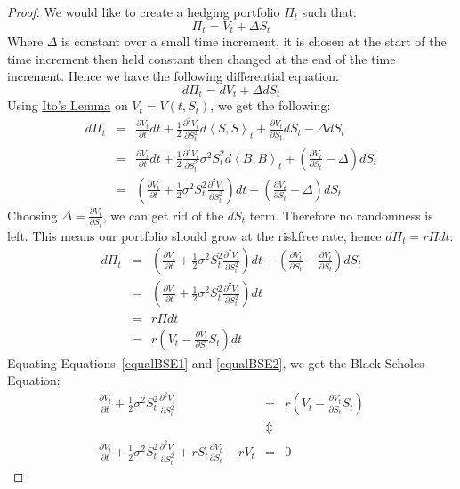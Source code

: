 \documentclass[11pt]{article}
\theoremstyle{definition}
\newcommand{\brac}[1]{\left(#1\right)}
\newcommand{\pbrac}[1]{\left\langle#1\right\rangle}
\newcommand{\pardiff}[2]{\frac{\partial #1}{\partial #2}}
\begin{document}
	\begin{proof}
		We would like to create a hedging portfolio $\Pi_t$ such that:
		$$\Pi_t = V_t + \Delta S_t$$
		Where $\Delta$ is constant over a small time increment, it is chosen at the start of the time increment then held constant then changed at the end of the time increment. Hence we have the following differential equation:
		$$d\Pi_t = dV_t + \Delta dS_t$$
		Using \hyperref[itosLemma]{Ito's Lemma} on $V_t = V\brac{t,S_t}$, we get the following:
		\begin{eqnarray*}
			d\Pi_t &=& \pardiff{V_t}{t}dt + \frac{1}{2}\pardiff{^2V_t}{S_t^2}d\pbrac{S,S}_t + \pardiff{V_t}{S_t}dS_t - \Delta dS_t\\
			&=& \pardiff{V_t}{t}dt + \frac{1}{2}\pardiff{^2V_t}{S_t^2}\sigma^2S_t^2d\pbrac{B,B}_t + \brac{\pardiff{V_t}{S_t} - \Delta} dS_t\\
			&=& \brac{\pardiff{V_t}{t} + \frac{1}{2}\sigma^2S_t^2\pardiff{^2V_t}{S_t^2}}dt+ \brac{\pardiff{V_t}{S_t} - \Delta} dS_t
		\end{eqnarray*}
		Choosing $\Delta = \pardiff{V_t}{S_t}$, we can get rid of the $dS_t$ term. Therefore no randomness is left. This means our portfolio should grow at the riskfree rate, hence $d\Pi_t = r\Pi dt$:
		\begin{eqnarray}
			d\Pi_t &=& \brac{\pardiff{V_t}{t} + \frac{1}{2}\sigma^2S_t^2\pardiff{^2V_t}{S_t^2}}dt+ \brac{\pardiff{V_t}{S_t} - \pardiff{V_t}{S_t}} dS_t\\
			&=& \brac{\pardiff{V_t}{t} + \frac{1}{2}\sigma^2S_t^2\pardiff{^2V_t}{S_t^2}}dt\label{equalBSE1}\\
			&=& r\Pi dt\\
			&=& r\brac{V_t - \pardiff{V_t}{S_t}S_t}dt\label{equalBSE2}		
		\end{eqnarray}
		Equating Equations~\ref{equalBSE1} and \ref{equalBSE2}, we get the Black-Scholes Equation:
		\begin{eqnarray}
			\pardiff{V_t}{t} + \frac{1}{2}\sigma^2S_t^2\pardiff{^2V_t}{S_t^2} &=& r\brac{V_t - \pardiff{V_t}{S_t}S_t}\\
			&\Updownarrow&\\
			\pardiff{V_t}{t} + \frac{1}{2}\sigma^2S_t^2\pardiff{^2V_t}{S_t^2} + rS_t\pardiff{V_t}{S_t} -rV_t &=& 0
		\end{eqnarray}
	\end{proof}
	
\end{document}
